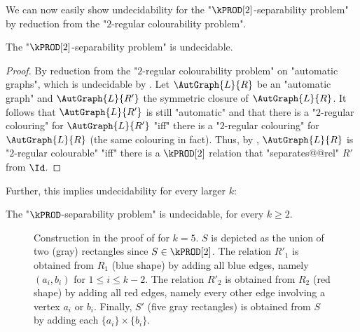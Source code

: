 We can now easily show undecidability for the "$\kPROD[2]$-separability problem" by reduction from the "$2$-regular colourability problem".
\begin{lemma}\AP\label{lem:aut-2prod-sep-undec}
    The "$\kPROD[2]$-separability problem" is undecidable.
\end{lemma}
\begin{proof}
    By reduction from the "$2$-regular colourability problem" on "automatic graphs", which is undecidable by . Let $\AutGraph{L}{R}$ be an "automatic graph" and $\AutGraph{L}{R'}$ the symmetric closure of $\AutGraph{L}{R}$. It follows that $\AutGraph{L}{R'}$ is still "automatic" and that there is a "$2$-regular colouring" for $\AutGraph{L}{R'}$ "iff" there is a "$2$-regular colouring" for $\AutGraph{L}{R}$ (the same colouring in fact).
    Thus, by , $\AutGraph{L}{R}$ is "$2$-regular colourable" "iff" 
    there is a $\kPROD[2]$ relation that "separates@@rel" $R'$ from $\Id$.
\end{proof}

Further, this implies undecidability for every larger $k$:
\begin{theorem}
    \AP\label{thm:kprod-undecidable}
    The "$\kPROD$-separability problem" is undecidable, for every $k \geq 2$.
\end{theorem}

\begin{figure}
    \centering
    \begin{tikzpicture}
        
    \end{tikzpicture}
    \caption{
        \AP\label{fig:2prod-to-kprod}
        Construction in the proof of  for $k = 5$. $S$ is depicted as the union of two (gray) rectangles since $S \in \kPROD[2]$.
        The relation $R'_1$ is obtained from $R_1$ (blue shape) by adding all blue edges,
        namely $(a_i, b_i)$ for $1\leq i \leq k-2$. The relation $R'_2$ is obtained from $R_2$ (red shape) by adding
        all red edges, namely every other edge involving a vertex $a_i$ or $b_i$.
        Finally, $S'$ (five gray rectangles) is obtained from $S$ by adding
        each $\{a_i\} \times \{b_i\}$.
    }
\end{figure}

